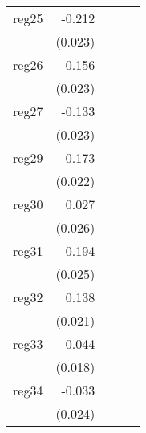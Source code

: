 {\begin{longtable}{l*{4}{D{.}{.}{-1}}}
\addlinespace
reg25       &      -0.212\sym{***}&                     &                     &                     \\
            &     (0.023)         &                     &                     &                     \\
\addlinespace
reg26       &      -0.156\sym{***}&                     &                     &                     \\
            &     (0.023)         &                     &                     &                     \\
\addlinespace
reg27       &      -0.133\sym{***}&                     &                     &                     \\
            &     (0.023)         &                     &                     &                     \\
\addlinespace
reg29       &      -0.173\sym{***}&                     &                     &                     \\
            &     (0.022)         &                     &                     &                     \\
\addlinespace
reg30       &       0.027         &                     &                     &                     \\
            &     (0.026)         &                     &                     &                     \\
\addlinespace
reg31       &       0.194\sym{***}&                     &                     &                     \\
            &     (0.025)         &                     &                     &                     \\
\addlinespace
reg32       &       0.138\sym{***}&                     &                     &                     \\
            &     (0.021)         &                     &                     &                     \\
\addlinespace
reg33       &      -0.044\sym{*}  &                     &                     &                     \\
            &     (0.018)         &                     &                     &                     \\
\addlinespace
reg34       &      -0.033         &                     &                     &                     \\
            &     (0.024)         &                     &                     &                     \\

\end{longtable}}
